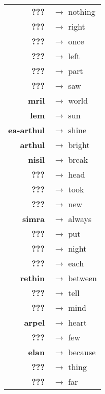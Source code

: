 \begin{tabular}{rl}
\textbf{???} & $\rightarrow$ nothing \\
\textbf{???} & $\rightarrow$ right \\
\textbf{???} & $\rightarrow$ once \\
\textbf{???} & $\rightarrow$ left \\
\textbf{???} & $\rightarrow$ part \\
\textbf{???} & $\rightarrow$ saw \\
\textbf{mril} & $\rightarrow$ world \\
\textbf{lem} & $\rightarrow$ sun \\
\textbf{ea-arthul} & $\rightarrow$ shine \\
\textbf{arthul} & $\rightarrow$ bright \\
\textbf{nisil} & $\rightarrow$ break \\
\textbf{???} & $\rightarrow$ head \\
\textbf{???} & $\rightarrow$ took \\
\textbf{???} & $\rightarrow$ new \\
\textbf{simra} & $\rightarrow$ always \\
\textbf{???} & $\rightarrow$ put \\
\textbf{???} & $\rightarrow$ night \\
\textbf{???} & $\rightarrow$ each \\
\textbf{rethin} & $\rightarrow$ between \\
\textbf{???} & $\rightarrow$ tell \\
\textbf{???} & $\rightarrow$ mind \\
\textbf{arpel} & $\rightarrow$ heart \\
\textbf{???} & $\rightarrow$ few \\
\textbf{elan} & $\rightarrow$ because \\
\textbf{???} & $\rightarrow$ thing \\
\textbf{???} & $\rightarrow$ far \\
\end{tabular}


